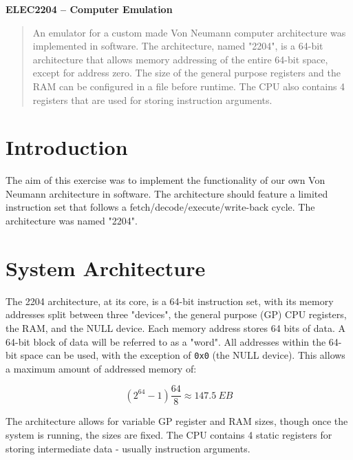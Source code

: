 \documentclass[a4paper,11pt]{article}
\begin{document}
  
\begin{center}
{\Large{\textbf{ELEC2204 -- Computer Emulation}}} \\ [\baselineskip]

\end{center}

\begin{abstract}
    An emulator for a custom made Von Neumann computer architecture was implemented in software. The architecture, named "2204", is a 64-bit architecture that allows memory addressing of the entire 64-bit space, except for address zero. The size of the general purpose registers and the RAM can be configured in a file before runtime. The CPU also contains 4 registers that are used for storing instruction arguments.
\end{abstract}

\tableofcontents
\newpage

\section{Introduction}
    The aim of this exercise was to implement the functionality of our own Von Neumann architecture in software. The architecture should feature a limited instruction set that follows a fetch/decode/execute/write-back cycle. The architecture was named "2204".

\section{System Architecture}
    The 2204 architecture, at its core, is a 64-bit instruction set, with its memory addresses split between three "devices", the general purpose (GP) CPU registers, the RAM, and the NULL device. Each memory address stores 64 bits of data. A 64-bit block of data will be referred to as a "word". All addresses within the 64-bit space can be used, with the exception of \lstinline{0x0} (the NULL device). This allows a maximum amount of addressed memory of:
    
    \begin{displaymath}
        \left(2^{64} - 1\right) \frac{64}{8} \approx \SI{147.5}{EB}
    \end{displaymath}
    
    The architecture allows for variable GP register and RAM sizes, though once the system is running, the sizes are fixed. The CPU contains 4 static registers for storing intermediate data - usually instruction arguments.
    
\end{document}
